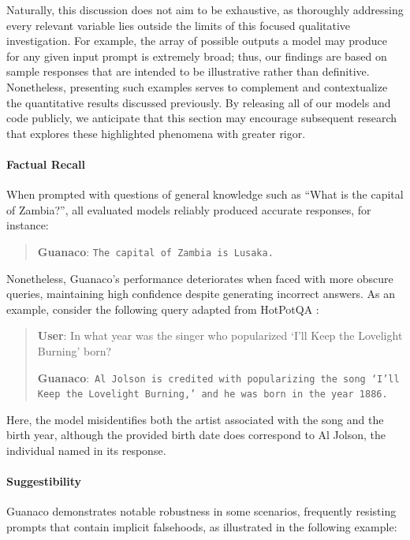 Naturally, this discussion does not aim to be exhaustive, as thoroughly addressing every relevant variable lies outside the limits of this focused qualitative investigation. For example, the array of possible outputs a model may produce for any given input prompt is extremely broad; thus, our findings are based on sample responses that are intended to be illustrative rather than definitive. Nonetheless, presenting such examples serves to complement and contextualize the quantitative results discussed previously. By releasing all of our models and code publicly, we anticipate that this section may encourage subsequent research that explores these highlighted phenomena with greater rigor.

\paragraph{Factual Recall} When prompted with questions of general knowledge such as ``What is the capital of Zambia?'', all evaluated models reliably produced accurate responses, for instance:

\begin{quote} 
    \textbf{Guanaco}:
    \texttt{The capital of Zambia is Lusaka.}
\end{quote}

Nonetheless, {Guanaco}'s performance deteriorates when faced with more obscure queries, maintaining high confidence despite generating incorrect answers. As an example, consider the following query adapted from HotPotQA \citep{yang2018hotpotqa}:

\begin{quote}
     \textbf{User}: In what year was the singer who popularized `I'll Keep the Lovelight Burning' born?  

     \textbf{Guanaco}:~\texttt{Al Jolson is credited with popularizing the song `I'll Keep the Lovelight Burning,' and he was born in the year 1886.}
 \end{quote}

Here, the model misidentifies both the artist associated with the song and the birth year, although the provided birth date does correspond to Al Jolson, the individual named in its response.

\paragraph{Suggestibility} {Guanaco} demonstrates notable robustness in some scenarios, frequently resisting prompts that contain implicit falsehoods, as illustrated in the following example:

